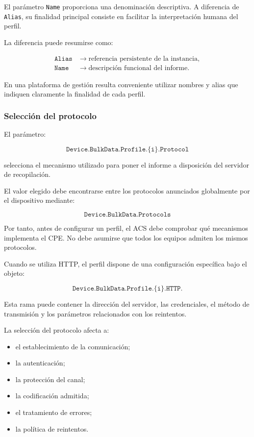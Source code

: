 El parámetro \texttt{Name} proporciona una denominación descriptiva. A
diferencia de \texttt{Alias}, su finalidad principal consiste en facilitar
la interpretación humana del perfil.

La diferencia puede resumirse como:

\[
\begin{aligned}
    \texttt{Alias}
    &\longrightarrow
    \text{referencia persistente de la instancia},\\
    \texttt{Name}
    &\longrightarrow
    \text{descripción funcional del informe}.
\end{aligned}
\]

En una plataforma de gestión resulta conveniente utilizar nombres y alias
que indiquen claramente la finalidad de cada perfil.


\subsubsection*{Selección del protocolo}

El parámetro:

\[
    \texttt{Device.BulkData.Profile.\{i\}.Protocol}
\]

selecciona el mecanismo utilizado para poner el informe a disposición del
servidor de recopilación.

El valor elegido debe encontrarse entre los protocolos anunciados
globalmente por el dispositivo mediante:

\[
    \texttt{Device.BulkData.Protocols}
\]

Por tanto, antes de configurar un perfil, el ACS debe comprobar qué
mecanismos implementa el CPE. No debe asumirse que todos los equipos
admiten los mismos protocolos.

Cuando se utiliza HTTP, el perfil dispone de una configuración específica
bajo el objeto:

\[
    \texttt{Device.BulkData.Profile.\{i\}.HTTP.}
\]

Esta rama puede contener la dirección del servidor, las credenciales, el
método de transmisión y los parámetros relacionados con los reintentos.

La selección del protocolo afecta a:

\begin{itemize}
    \item el establecimiento de la comunicación;
    \item la autenticación;
    \item la protección del canal;
    \item la codificación admitida;
    \item el tratamiento de errores;
    \item la política de reintentos.
\end{itemize}


